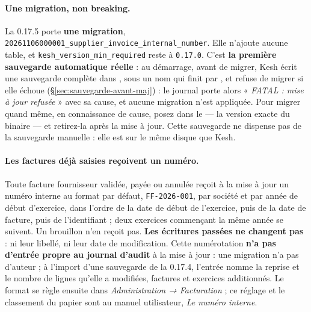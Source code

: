 \documentclass[a4paper,11pt,oneside]{article}
\begin{document}
\begin{sloppypar}
\paragraph{Une migration, non breaking.} La 0.17.5 porte \textbf{une migration}, \texttt{20261106000001\_supplier\_invoice\_internal\_number}. Elle n'ajoute aucune table, et \texttt{kesh\_version\_min\_required} reste à \texttt{0.17.0}. C'est \textbf{la première sauvegarde automatique réelle} : au démarrage, avant de migrer, Kesh écrit une sauvegarde complète dans , sous un nom qui finit par , et refuse de migrer si elle échoue (\S\ref{sec:sauvegarde-avant-maj}) : le journal porte alors « \emph{FATAL : mise à jour refusée} » avec sa cause, et aucune migration n'est appliquée. Pour migrer quand même, en connaissance de cause, posez  dans le  --- la version exacte du binaire --- et retirez-la après la mise à jour. Cette sauvegarde ne dispense pas de la sauvegarde manuelle : elle est sur le même disque que Kesh.
\end{sloppypar}

\paragraph{Les factures déjà saisies reçoivent un numéro.} Toute facture fournisseur validée, payée ou annulée reçoit à la mise à jour un numéro interne au format par défaut, \texttt{FF-2026-001}, par société et par année de début d'exercice, dans l'ordre de la date de début de l'exercice, puis de la date de facture, puis de l'identifiant ; deux exercices commençant la même année se suivent. Un brouillon n'en reçoit pas. \textbf{Les écritures passées ne changent pas} : ni leur libellé, ni leur date de modification. Cette numérotation \textbf{n'a pas d'entrée propre au journal d'audit} à la mise à jour : une migration n'a pas d'auteur ; à l'import d'une sauvegarde de la 0.17.4, l'entrée  nomme la reprise et le nombre de lignes qu'elle a modifiées, factures et exercices additionnés. Le format se règle ensuite dans \emph{Administration → Facturation} ; ce réglage et le classement du papier sont au manuel utilisateur, \emph{Le numéro interne}.
\end{document}
